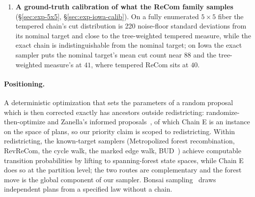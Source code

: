 \documentclass[11pt]{article}
\begin{document}
\begin{enumerate}
    under a criterion fixed before the runs, the mixture gives $1.6$ to
    $2.3$ times the forest move's effective samples per second under
    perimeter and density targets on two seeds, and $0.8$ to $0.9$
    times under the spanning-tree-weighted tempered measure. The
    reason is structural: the forest move is an independence sampler
    from the untempered spanning-tree measure, its acceptance on
    $N \times N$ grids falls like $e^{-0.24 N}$ under
    compactness-tempered targets with or without tree weights, and
    the per-proposal mismatch in its Hastings ratio grows with the
    boundary length. The local move loses acceptance with pair size
    too, but has a dial for it, the move-size law; the tree move has
    none.
  \item \textbf{A ground-truth calibration of what the ReCom family
    samples} (\S\ref{sec:exp-5x5}, \S\ref{sec:exp-iowa-calib}). On a
    fully enumerated $5 \times 5$ fiber the tempered chain's cut
    distribution is 220 noise-floor standard deviations from its
    nominal target and close to the tree-weighted tempered measure,
    while the exact chain is indistinguishable from the nominal
    target; on Iowa the exact sampler puts the nominal target's mean
    cut count near $88$ and the tree-weighted measure's at $41$, where
    tempered ReCom sits at $40$.
\end{enumerate}

\paragraph{Positioning.} A deterministic optimization that sets the
parameters of a random proposal which is then corrected exactly has
ancestors outside redistricting: randomize-then-optimize
\cite{bardsley2014randomize} and Zanella's informed
proposals~\cite{zanella2020informed}, of which Chain E is an instance
on the space of plans, so our priority claim is scoped to
redistricting. Within redistricting, the known-target samplers
(Metropolized forest recombination, RevReCom, the cycle walk, the
marked edge walk, BUD~\cite{autry2023metropolized,cannon2022spanning,
deford2025cycle,mcwhorter2025marked,akitaya2026bud}) achieve
computable transition probabilities by lifting to spanning-forest
state spaces, while Chain E does so at the partition level; the two
routes are complementary and the forest move is the global component
of our sampler. Bonsai sampling~\cite{clelland2026bonsai} draws
independent plans from a specified law without a chain.
\end{document}
